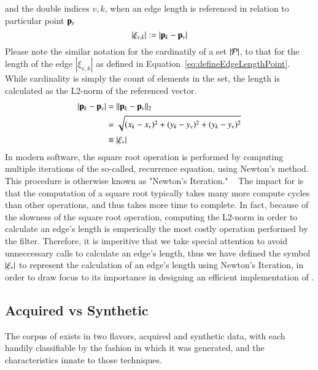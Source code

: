 and the double indices $v,k$, when an edge length is referenced in relation to particular point $\mathbf{p}_v$
\begin{equation}
	|\xi_{v,k}| := |\mathbf{p}_k - \mathbf{p}_v|
	\label{eq:defineEdgeLengthPoint}
\end{equation}
%
%
Please note the similar notation for the cardinatily of a set $|\mathcal{P}|$, to that for the length of the edge $|\xi_{v,k}|$ as defined in Equation~\ref{eq:defineEdgeLengthPoint}. While cardinality is simply the count of elements in the set, the length is calculated as the L2-norm of the referenced vector.~\cite[p.~26]{Mara12}
\begin{equation}
\begin{aligned}
	|\mathbf{p}_k - \mathbf{p}_v| & = \lVert\mathbf{p}_k - \mathbf{p}_v\rVert_2 \\
					& = \sqrt{(x_k-x_v)^2 + (y_k-y_v)^2 + (y_k-y_v)^2} \\
					& \equiv \left |\xi_\ast \right |
	\label{eq:defineEdgeLengthCalc}
\end{aligned}
\end{equation}
%
In modern software, the square root operation is performed by computing multiple iterations of the so-called, recurrence equation, using Newton's method. This procedure is otherwise known as "Newton's Iteration." ~\cite{Weisstein19b} The impact for  is that the computation of a square root typically takes many more compute cycles than other operations, and thus takes more time to complete. In fact, because of the slowness of the square root operation, computing the L2-norm in order to calculate an edge's length is emperically the most costly operation performed by the filter. Therefore, it is imperitive that we take special attention to avoid unneccessary calls to calculate an edge's length, thus we have defined the symbol $\left |\xi_\ast \right |$ to represent the calculation of an edge's length using Newton's Iteration, in order to draw focus to its importance  in designing an efficient implementation of .
%
\subsection{Acquired vs Synthetic \tdd{}}
\label{chBsSvA}
The corpus of \tdd{} exists in two flavors, acquired and synthetic data, with each handily classifiable by the fashion in which it was generated, and the characteristics innate to those techniques.

